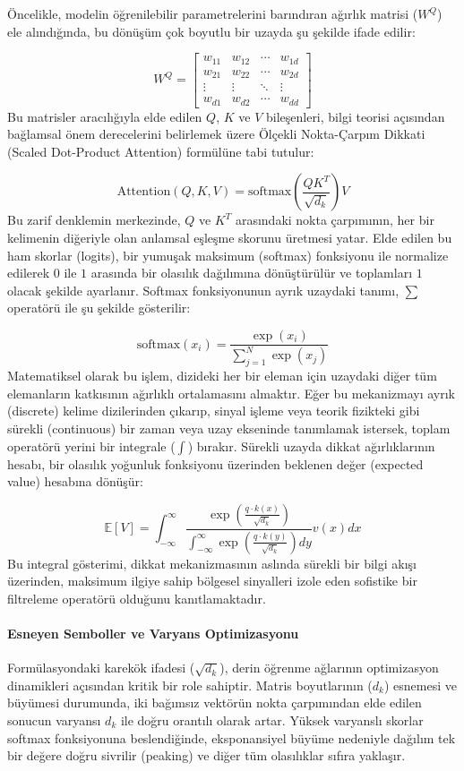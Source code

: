 \documentclass[11pt,a4paper]{article}
\begin{document}
Öncelikle, modelin öğrenilebilir parametrelerini barındıran ağırlık matrisi (\(W^Q\)) ele alındığında, bu dönüşüm çok boyutlu bir uzayda şu şekilde ifade edilir:

\[
W^Q = \begin{bmatrix} w_{11} & w_{12} & \cdots & w_{1d} \\ w_{21} & w_{22} & \cdots & w_{2d} \\ \vdots & \vdots & \ddots & \vdots \\ w_{d1} & w_{d2} & \cdots & w_{dd} \end{bmatrix}
\]
Bu matrisler aracılığıyla elde edilen \(Q\), \(K\) ve \(V\) bileşenleri, bilgi teorisi açısından bağlamsal önem derecelerini belirlemek üzere Ölçekli Nokta-Çarpım Dikkati (Scaled Dot-Product Attention) formülüne tabi tutulur:

\[
\text{Attention}(Q, K, V) = \text{softmax}\left( \frac{QK^T}{\sqrt{d_k}} \right)V
\]
Bu zarif denklemin merkezinde, \(Q\) ve \(K^T\) arasındaki nokta çarpımının, her bir kelimenin diğeriyle olan anlamsal eşleşme skorunu üretmesi yatar. Elde edilen bu ham skorlar (logits), bir yumuşak maksimum (softmax) fonksiyonu ile normalize edilerek \(0\) ile \(1\) arasında bir olasılık dağılımına dönüştürülür ve toplamları \(1\) olacak şekilde ayarlanır. Softmax fonksiyonunun ayrık uzaydaki tanımı, \(\sum\) operatörü ile şu şekilde gösterilir:

\[
\text{softmax}(x_i) = \frac{\exp(x_i)}{\sum_{j=1}^{N} \exp(x_j)}
\]
Matematiksel olarak bu işlem, dizideki her bir eleman için uzaydaki diğer tüm elemanların katkısının ağırlıklı ortalamasını almaktır. Eğer bu mekanizmayı ayrık (discrete) kelime dizilerinden çıkarıp, sinyal işleme veya teorik fizikteki gibi sürekli (continuous) bir zaman veya uzay ekseninde tanımlamak istersek, toplam operatörü yerini bir integrale (\(\int\)) bırakır. Sürekli uzayda dikkat ağırlıklarının hesabı, bir olasılık yoğunluk fonksiyonu üzerinden beklenen değer (expected value) hesabına dönüşür:

\[
\mathbb{E}[V] = \int_{-\infty}^{\infty} \frac{\exp\left( \frac{q \cdot k(x)}{\sqrt{d_k}} \right)}{\int_{-\infty}^{\infty} \exp\left( \frac{q \cdot k(y)}{\sqrt{d_k}} \right) dy} v(x) dx
\]
Bu integral gösterimi, dikkat mekanizmasının aslında sürekli bir bilgi akışı üzerinden, maksimum ilgiye sahip bölgesel sinyalleri izole eden sofistike bir filtreleme operatörü olduğunu kanıtlamaktadır.

\paragraph{Esneyen Semboller ve Varyans Optimizasyonu}
Formülasyondaki karekök ifadesi (\(\sqrt{d_k}\)), derin öğrenme ağlarının optimizasyon dinamikleri açısından kritik bir role sahiptir. Matris boyutlarının (\(d_k\)) esnemesi ve büyümesi durumunda, iki bağımsız vektörün nokta çarpımından elde edilen sonucun varyansı \(d_k\) ile doğru orantılı olarak artar. Yüksek varyanslı skorlar softmax fonksiyonuna beslendiğinde, eksponansiyel büyüme nedeniyle dağılım tek bir değere doğru sivrilir (peaking) ve diğer tüm olasılıklar sıfıra yaklaşır.
\end{document}
